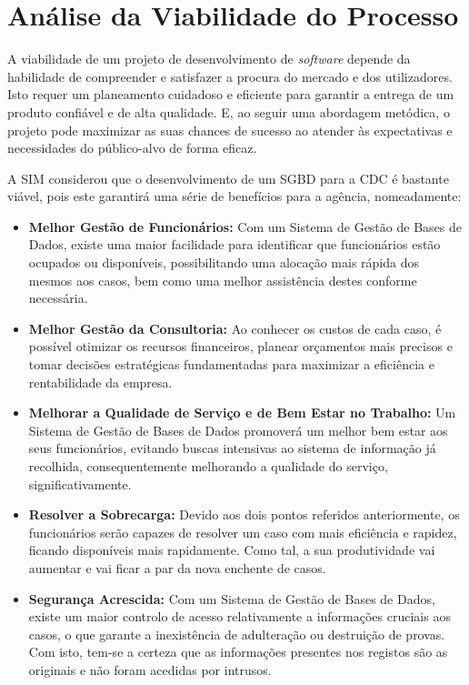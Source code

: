 \documentclass[a4paper,12pt]{scrreprt}
\begin{document}
    \clearpage

    \section{Análise da Viabilidade do Processo}
        A viabilidade de um projeto de desenvolvimento de \textit{software} depende da habilidade de compreender e satisfazer a procura do mercado e dos utilizadores. Isto requer um planeamento cuidadoso e eficiente para garantir a
        entrega de um produto confiável e de alta qualidade. E, ao seguir uma abordagem metódica, o projeto pode
        maximizar as suas chances de sucesso ao atender às expectativas e necessidades do público-alvo de forma eficaz.
        
        A SIM considerou que o desenvolvimento de um SGBD para a CDC é bastante viável, pois este garantirá uma série de benefícios para a agência, nomeadamente:
        
        \begin{itemize}
            \item \textbf{Melhor Gestão de Funcionários:} Com um Sistema de Gestão de Bases de Dados, existe uma maior facilidade para identificar que funcionários estão ocupados ou disponíveis, possibilitando uma alocação mais rápida dos mesmos aos casos, bem como uma melhor assistência destes conforme necessária.
            
            \item \textbf{Melhor Gestão da Consultoria:} Ao conhecer os custos de cada caso, é possível otimizar os recursos financeiros, planear orçamentos mais precisos e tomar decisões estratégicas fundamentadas para maximizar a eficiência e rentabilidade da empresa.
            
            \item \textbf{Melhorar a Qualidade de Serviço e de Bem Estar no Trabalho:} Um Sistema de Gestão de Bases de Dados
                promoverá um melhor bem estar aos seus funcionários, evitando buscas intensivas ao sistema de
                informação já recolhida, consequentemente melhorando a qualidade do serviço, significativamente.
                
            \item \textbf{Resolver a Sobrecarga:} Devido aos dois pontos referidos anteriormente, os funcionários
                serão capazes de resolver um caso com mais eficiência e rapidez, ficando disponíveis mais rapidamente.
                Como tal, a sua produtividade vai aumentar e vai ficar a par da nova enchente de casos.
                
            \item \textbf{Segurança Acrescida:} Com um Sistema de Gestão de Bases de Dados, existe um maior controlo de acesso relativamente a informações cruciais aos casos, o que garante a inexistência de adulteração ou destruição de provas. Com isto, tem-se a certeza que as informações presentes nos registos são as originais e não foram acedidas por intrusos.
        \end{itemize}
        
\end{document}
